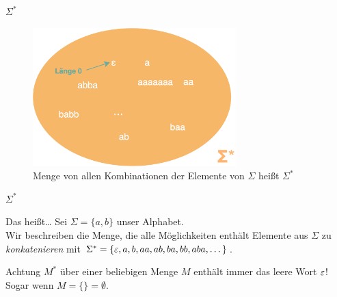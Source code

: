 \begin{frame}[fragile]{$\Sigma^\ast$}
\begin{figure}
    \centering
    \includegraphics[width=0.7\textwidth]{../figures/SigmaSternEpsilon.png}
    \caption{Menge von allen Kombinationen der Elemente von $\Sigma$ heißt $\Sigma^\ast$}
\end{figure}
\end{frame}

\begin{frame}[fragile]{$\Sigma^\ast$}
    \begin{exampleblock}{Das heißt\dots}
    Sei $\Sigma = \{a,b\}$ unser \alert{Alphabet}.\\
    Wir beschreiben die Menge, die alle Möglichkeiten enthält Elemente aus $\Sigma$ zu \emph{konkatenieren} mit $\Sigma^\ast=\{\varepsilon,a,b,aa,ab,ba,bb,aba,\dots\}$.
    \end{exampleblock}\pause
    
    \begin{alertblock}{Achtung}
    $M^\ast$ über einer beliebigen Menge $M$ enthält immer das leere Wort $\varepsilon$!\\
    Sogar wenn $M = \{\} = \emptyset$.\\
    
    \end{alertblock}
\end{frame}

